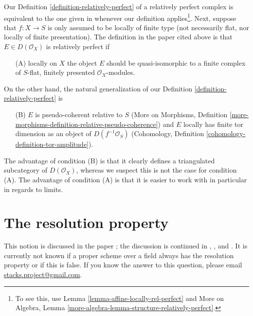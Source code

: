 \begin{remark}
\label{remark-discuss-rel-perfect}
Our Definition \ref{definition-relatively-perfect} of a
relatively perfect complex is equivalent to the one given
in \cite{lieblich-complexes} whenever our definition applies\footnote{To
see this, use Lemma \ref{lemma-affine-locally-rel-perfect} and
More on Algebra, Lemma \ref{more-algebra-lemma-structure-relatively-perfect}.}.
Next, suppose that $f : X \to S$ is only assumed to be locally
of finite type (not necessarily flat, nor locally of finite
presentation). The definition in the paper cited above is that
$E \in D(\mathcal{O}_X)$ is relatively perfect if
\begin{enumerate}
\item[(A)] locally on $X$ the object $E$ should be
quasi-isomorphic to a finite complex of
$S$-flat, finitely presented $\mathcal{O}_X$-modules.
\end{enumerate}
On the other hand, the natural generalization of our
Definition \ref{definition-relatively-perfect} is
\begin{enumerate}
\item[(B)] $E$ is pseudo-coherent relative to $S$
(More on Morphisms, Definition
\ref{more-morphisms-definition-relative-pseudo-coherence})
and $E$ locally has finite tor dimension as an object of
$D(f^{-1}\mathcal{O}_S)$
(Cohomology, Definition \ref{cohomology-definition-tor-amplitude}).
\end{enumerate}
The advantage of condition (B) is that it clearly defines a triangulated
subcategory of $D(\mathcal{O}_X)$, whereas we suspect this is not
the case for condition (A). The advantage of condition (A)
is that it is easier to work with in particular in regards to limits.
\end{remark}









\section{The resolution property}
\label{section-resolution-property}

\noindent
This notion is discussed in the paper \cite{totaro_resolution};
the discussion is continued in \cite{Gross-thesis},
\cite{Gross-surface}, and \cite{Gross-stack}.
It is currently not known if a proper scheme over a field
always has the resolution property or if this is false.
If you know the answer to this question, please email
\href{mailto:stacks.project@gmail.com}{stacks.project@gmail.com}.

